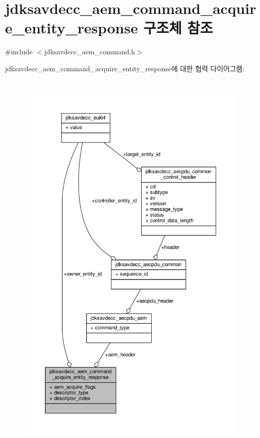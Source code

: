 \hypertarget{structjdksavdecc__aem__command__acquire__entity__response}{}\section{jdksavdecc\+\_\+aem\+\_\+command\+\_\+acquire\+\_\+entity\+\_\+response 구조체 참조}
\label{structjdksavdecc__aem__command__acquire__entity__response}


{\ttfamily \#include $<$jdksavdecc\+\_\+aem\+\_\+command.\+h$>$}



jdksavdecc\+\_\+aem\+\_\+command\+\_\+acquire\+\_\+entity\+\_\+response에 대한 협력 다이어그램\+:
\nopagebreak
\begin{figure}[H]
\begin{center}
\leavevmode
\includegraphics[height=550pt]{structjdksavdecc__aem__command__acquire__entity__response__coll__graph}
\end{center}
\end{figure}
